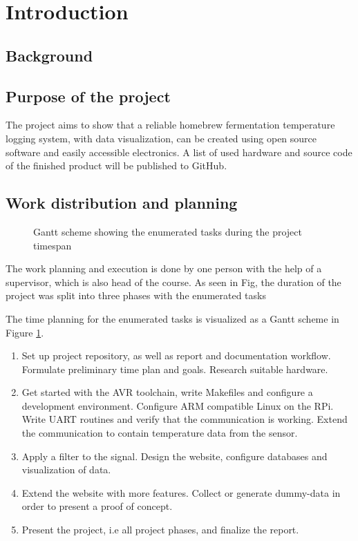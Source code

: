 \section{Introduction}%
\label{sec:introduction}

\subsection{Background}%
\label{sub:background}

\subsection{Purpose of the project}%
\label{sub:purpose_of_the_project}
The project aims to show that a reliable homebrew fermentation temperature logging system, with data visualization, can be created using open source software and easily accessible electronics. A list of used hardware and source code of the finished product will be published to GitHub.

\subsection{Work distribution and planning}%
\label{sub:work_distribution_and_planning}
\begin{figure}[h]
  \centering
  
  \caption{Gantt scheme showing the enumerated tasks during the project timespan}
  \label{fig:gantt}
\end{figure}

The work planning and execution is done by one person with the help of a supervisor, which is also head of the course. As seen in Fig, the duration of the project was split into three phases with the enumerated tasks

The time planning for the enumerated tasks is visualized as a Gantt scheme in Figure \ref{fig:gantt}.
\begin{enumerate}
  \item
Set up project repository, as well as report and documentation workflow. Formulate preliminary time plan and goals. Research suitable hardware.
  \item
Get started with the AVR toolchain, write Makefiles and configure a development environment. Configure ARM compatible Linux on the RPi. Write UART routines and verify that the communication is working. Extend the communication to contain temperature data from the sensor.
  \item
    Apply a filter to the signal. Design the website, configure databases and visualization of data.
  \item
    Extend the website with more features. Collect or generate dummy-data in order to present a proof of concept.
  \item Present the project, i.e all project phases, and finalize the report.
\end{enumerate}

